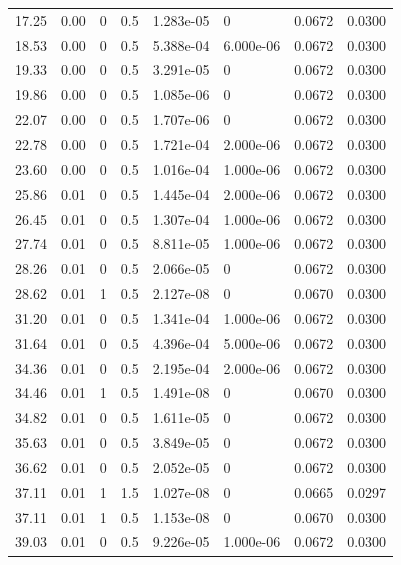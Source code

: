 \documentclass[preview]{standalone}
\begin{document}
{{\begin{tabular}{L{1.2cm}C{1.2cm} C{0.3cm}C{0.5cm} C{1.4cm}C{1.4cm} C{1.4cm}C{1.4cm}}
  17.25  &  0.00  & 0     & 0.5 &  1.283e-05  & 0  & 0.0672 &  0.0300   \\ 
  18.53  &  0.00  & 0     & 0.5 &  5.388e-04  & 6.000e-06  & 0.0672 &  0.0300   \\ 
  19.33  &  0.00  & 0     & 0.5 &  3.291e-05  & 0  & 0.0672 &  0.0300   \\ 
  19.86  &  0.00  & 0     & 0.5 &  1.085e-06  & 0  & 0.0672 &  0.0300   \\ 
  22.07  &  0.00  & 0     & 0.5 &  1.707e-06  & 0  & 0.0672 &  0.0300   \\ 
  22.78  &  0.00  & 0     & 0.5 &  1.721e-04  & 2.000e-06  & 0.0672 &  0.0300   \\ 
  23.60  &  0.00  & 0     & 0.5 &  1.016e-04  & 1.000e-06  & 0.0672 &  0.0300   \\ 
  25.86  &  0.01  & 0     & 0.5 &  1.445e-04  & 2.000e-06  & 0.0672 &  0.0300   \\ 
  26.45  &  0.01  & 0     & 0.5 &  1.307e-04  & 1.000e-06  & 0.0672 &  0.0300   \\ 
  27.74  &  0.01  & 0     & 0.5 &  8.811e-05  & 1.000e-06  & 0.0672 &  0.0300   \\ 
  28.26  &  0.01  & 0     & 0.5 &  2.066e-05  & 0  & 0.0672 &  0.0300   \\ 
  28.62  &  0.01  & 1     & 0.5 &  2.127e-08  & 0  & 0.0670 &  0.0300   \\ 
  31.20  &  0.01  & 0     & 0.5 &  1.341e-04  & 1.000e-06  & 0.0672 &  0.0300   \\ 
  31.64  &  0.01  & 0     & 0.5 &  4.396e-04  & 5.000e-06  & 0.0672 &  0.0300   \\ 
  34.36  &  0.01  & 0     & 0.5 &  2.195e-04  & 2.000e-06  & 0.0672 &  0.0300   \\ 
  34.46  &  0.01  & 1     & 0.5 &  1.491e-08  & 0  & 0.0670 &  0.0300   \\ 
  34.82  &  0.01  & 0     & 0.5 &  1.611e-05  & 0  & 0.0672 &  0.0300   \\ 
  35.63  &  0.01  & 0     & 0.5 &  3.849e-05  & 0  & 0.0672 &  0.0300   \\ 
  36.62  &  0.01  & 0     & 0.5 &  2.052e-05  & 0  & 0.0672 &  0.0300   \\ 
  37.11  &  0.01  & 1     & 1.5 &  1.027e-08  & 0  & 0.0665 &  0.0297   \\ 
  37.11  &  0.01  & 1     & 0.5 &  1.153e-08  & 0  & 0.0670 &  0.0300   \\ 
  39.03  &  0.01  & 0     & 0.5 &  9.226e-05  & 1.000e-06  & 0.0672 &  0.0300   \\ 

\end{tabular}}}
\end{document}
